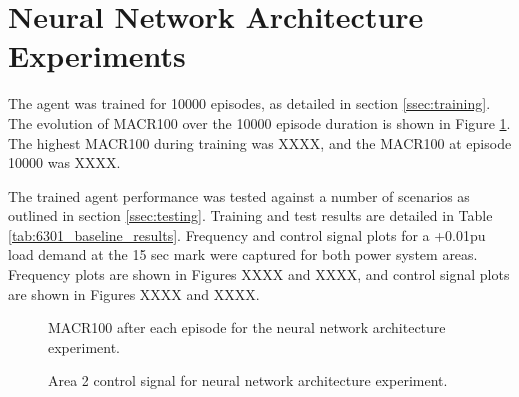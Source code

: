 \section{Neural Network Architecture Experiments}
The agent was trained for 10000 episodes, as detailed in section \ref{ssec:training}. The evolution of MACR100 over the 10000 episode duration is shown in Figure \ref{fig:6301_average_reward}. The highest MACR100 during training was XXXX, and the MACR100 at episode 10000 was XXXX.

The trained agent performance was tested against a number of scenarios as outlined in section \ref{ssec:testing}. Training and test results are detailed in Table \ref{tab:6301_baseline_results}. Frequency and control signal plots for a +0.01pu load demand at the 15 sec mark were captured for both power system areas. Frequency plots are shown in Figures XXXX and XXXX, and control signal plots are shown in Figures XXXX and XXXX.

\vspace{2cm}

\begin{figure}[h]
	\centering
	
	\caption{MACR100 after each episode for the neural network architecture experiment.}\label{fig:6301_average_reward}
\end{figure}



\begin{figure}[h]
	\centering
	
	
	\vspace{-0.5cm}
	\caption{Area 1 frequency response for neural network architecture experiment.}
	
	\vspace{0.5cm}
	
	
	\vspace{-0.5cm}
	\caption{Area 1 control signal for neural network architecture experiment.}
	
	\vspace{0.5cm}
	
	
	\vspace{-0.5cm}
	\caption{Area 2 frequency response for neural network architecture experiment.}
	
	\vspace{0.5cm}
			
	
	\vspace{-0.5cm}
	\caption{Area 2 control signal for neural network architecture experiment.}
\end{figure}